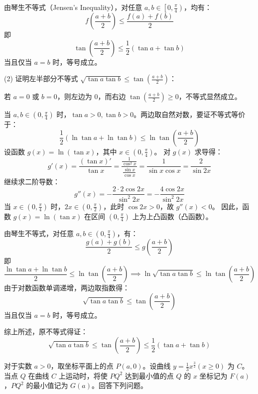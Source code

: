 \begin{questions}
\begin{solution}
由琴生不等式（Jensen's Inequality），对任意 $a, b \in \left[0, \frac{\pi}{4}\right)$，均有：
\[
f\left(\frac{a+b}{2}\right) \le \frac{f(a) + f(b)}{2}
\]
即
\[
\tan\left(\frac{a+b}{2}\right) \le \frac{1}{2}(\tan a + \tan b)
\]
当且仅当 $a = b$ 时，等号成立。

\vspace{1em}

(2) 证明左半部分不等式 $\sqrt{\tan a \tan b} \le \tan\left(\frac{a+b}{2}\right)$：

若 $a = 0$ 或 $b = 0$，则左边为 $0$，而右边 $\tan\left(\frac{a+b}{2}\right) \ge 0$，不等式显然成立。

当 $a, b \in \left(0, \frac{\pi}{4}\right)$ 时，$\tan a > 0, \tan b > 0$。两边取自然对数，要证不等式等价于：
\[
\frac{1}{2}(\ln\tan a + \ln\tan b) \le \ln\tan\left(\frac{a+b}{2}\right)
\]
设函数 $g(x) = \ln(\tan x)$，其中 $x \in \left(0, \frac{\pi}{4}\right)$。
对 $g(x)$ 求导得：
\[
g'(x) = \frac{(\tan x)'}{\tan x} = \frac{\frac{1}{\cos^2 x}}{\frac{\sin x}{\cos x}} = \frac{1}{\sin x \cos x} = \frac{2}{\sin 2x}
\]
继续求二阶导数：
\[
g''(x) = -\frac{2 \cdot 2\cos 2x}{\sin^2 2x} = -\frac{4\cos 2x}{\sin^2 2x}
\]
当 $x \in \left(0, \frac{\pi}{4}\right)$ 时，$2x \in \left(0, \frac{\pi}{2}\right)$，此时 $\cos 2x > 0$，故 $g''(x) < 0$。
因此，函数 $g(x) = \ln(\tan x)$ 在区间 $\left(0, \frac{\pi}{4}\right)$ 上为上凸函数（凸函数）。

由琴生不等式，对任意 $a, b \in \left(0, \frac{\pi}{4}\right)$，有：
\[
\frac{g(a) + g(b)}{2} \le g\left(\frac{a+b}{2}\right)
\]
即
\[
\frac{\ln\tan a + \ln\tan b}{2} \le \ln\tan\left(\frac{a+b}{2}\right) \implies \ln\sqrt{\tan a \tan b} \le \ln\tan\left(\frac{a+b}{2}\right)
\]
由于对数函数单调递增，两边取指数得：
\[
\sqrt{\tan a \tan b} \le \tan\left(\frac{a+b}{2}\right)
\]
当且仅当 $a = b$ 时，等号成立。

综上所述，原不等式得证：
\[
\sqrt{\tan a \tan b} \le \tan\left(\frac{a+b}{2}\right) \le \frac{1}{2}(\tan a + \tan b)
\]
\end{solution}

\question
对于实数 $a > 0$，取坐标平面上的点 $P(a, 0)$。设曲线 $y = \frac{1}{3} x^{\frac{3}{2}} (x \ge 0)$ 为 $C$。当点 $Q$ 在曲线 $C$ 上运动时，将使 $PQ^2$ 达到最小值的点 $Q$ 的 $x$ 坐标记为 $F(a)$，$PQ^2$ 的最小值记为 $G(a)$。回答下列问题。
\begin{parts}

\end{parts}
\end{questions}
